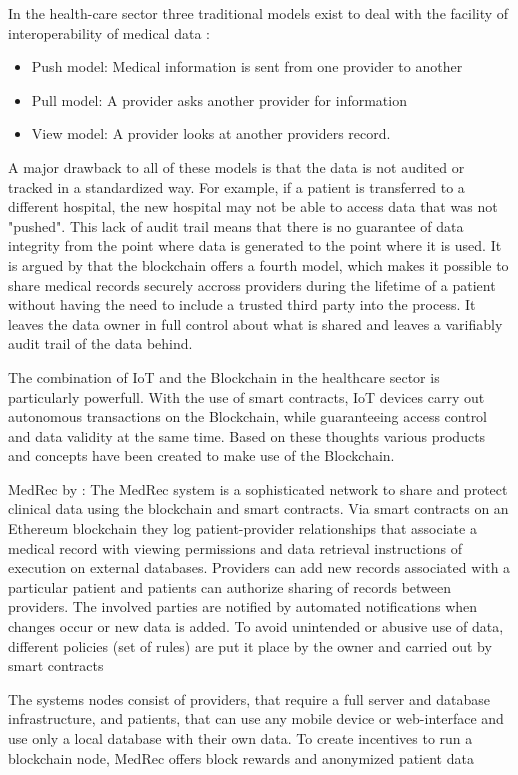 In the health-care sector three traditional models exist to deal with the facility of interoperability of medical data \cite{Kshetri2017}:
\begin{itemize}
	\item Push model: Medical information is sent from one provider to another
	\item Pull model: A provider asks another provider for information
	\item View model: A provider looks at another providers record.
\end{itemize}
A major drawback to all of these models is that the data is not audited or tracked in a standardized way. For example, if a patient is transferred to a different hospital, the new hospital may not be able to access data that was not "pushed". This lack of audit trail means that there is no guarantee of data integrity from the point where data is generated to the point where it is used. 
It is argued by \cite{Kshetri2017} that the blockchain offers a fourth model, which makes it possible to share medical records securely accross providers during the lifetime of a patient without having the need to include a trusted third party into the process. It leaves the data owner in full control about what is shared and leaves a varifiably audit trail of the data behind.

The combination of IoT and the Blockchain in the healthcare sector is particularly powerfull. With the use of smart contracts, IoT devices carry out autonomous transactions on the Blockchain, while guaranteeing access control and data validity at the same time. Based on these thoughts various products and concepts have been created to make use of the Blockchain.


MedRec by \citeauthor{Azaria2016}:
The MedRec system is a sophisticated network to share and protect clinical data using the blockchain and smart contracts. Via smart contracts on an Ethereum blockchain they log patient-provider relationships that associate a medical record with viewing permissions and data retrieval instructions of execution on external databases.
Providers can add new records associated with a particular patient and patients can authorize sharing of records between providers. The involved parties are notified by automated notifications when changes occur or new data is added.
To avoid unintended or abusive use of data, different policies (set of rules) are put it place by the owner and carried out by smart contracts 

The systems nodes consist of providers, that require a full server and database infrastructure, and patients, that can use any mobile device or web-interface and use only a local database with their own data.
To create incentives to run a blockchain node, MedRec offers block rewards and anonymized patient data



